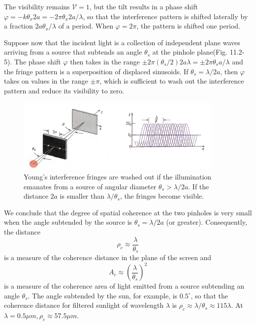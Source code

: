 \documentclass{article}
\numberwithin{figure}{subsection}
\numberwithin{table}{subsection}
\newcommand\degree{^\circ}
\begin{document}
The visibility remains $\mathcal{V} = 1 $, but the tilt results in a phase shift $ \varphi = -k\theta_x 2a = -2\pi \theta_x 2a / \lambda $, so that the interference pattern is shifted laterally by a fraction $ 2a \theta_x / \lambda $ of a period. When $ \varphi = 2\pi $, the pattern is shifted one period.
\par Suppose now that the incident light is a collection of independent plane waves arriving from a source that subtends an angle $ \theta_s $ at the pinhole plane(Fig. 11.2-5).
The phase shift $ \varphi $ then takes in the range $ \pm 2\pi (\theta_s / 2) 2a \lambda = \pm 2\pi \theta_s a / \lambda $ and the fringe pattern is a superposition of displaced sinusoids. If $ \theta_s = \lambda / 2a $, then $\varphi$ takes on values in the range $ \pm \pi $, which is sufficient to wash out the interference pattern and reduce its visibility to zero.
\begin{figure}[H]
\centering
\includegraphics[width=0.9\textwidth]{11_2_5.PNG}
\caption{Young's interference fringes are washed out if the illumination emanates from a source of angular diameter $ \theta_s > \lambda / 2a $. If the distance $2a$ is smaller than $ \lambda / \theta_s $, the fringes become visible.}
\label{fig: 11_2_5}
\end{figure}
\par We conclude that the degree of spatial coherence at the two pinholes is very small when the angle subtended by the source is $ \theta_s = \lambda / 2a $ (or greater). Consequently, the distance
\begin{equation}
\rho_c \approx \frac{\lambda}{\theta_s}
\end{equation}
is a measure of the coherence distance in the plane of the screen and
\begin{equation}
A_c \approx (\frac{\lambda}{\theta_s})^2
\end{equation}
is a measure of the coherence area of light emitted from a source subtending an angle $\theta_s$. The angle subtended by the sun, for example, is $0.5 \degree$, so that the coherence distance for filtered sunlight of wavelength $\lambda$ is $\rho_c \approx \lambda / \theta_s \approx 115\lambda$. At $\lambda = 0.5 \mu m, \rho_c \approx 57.5 \mu m$.
\end{document}
